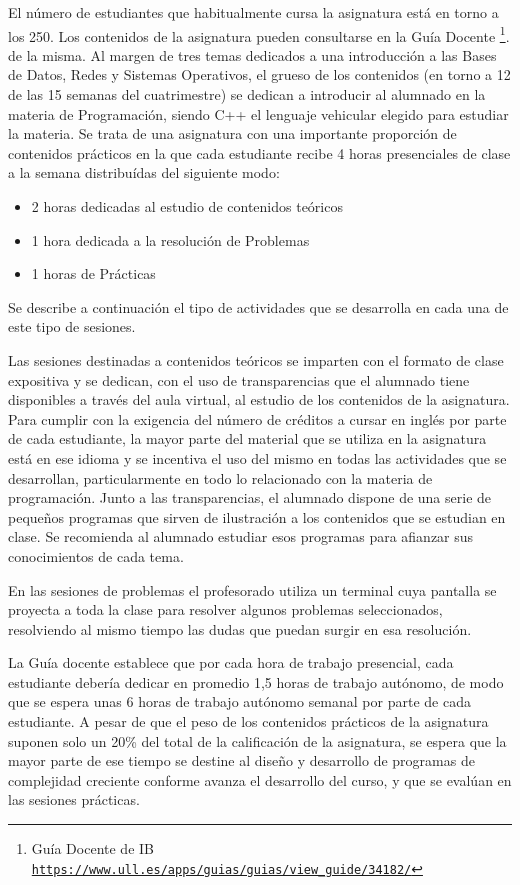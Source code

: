 \documentclass[twocolumn,twoside,a4paper, 10pt]{article}
\begin{document}
El número de estudiantes que habitualmente cursa la asignatura está en torno a los 250. 
Los contenidos de la asignatura pueden consultarse en la Guía Docente
\footnote{Guía Docente de IB\\ \href{https://www.ull.es/apps/guias/guias/view_guide/34182/}{\scriptsize{\texttt{https://www.ull.es/apps/guias/guias/view\_guide/34182/}}}}.
de la misma.
Al margen de tres temas dedicados a una introducción a las Bases de Datos, Redes y Sistemas Operativos,
el grueso de los contenidos (en torno a 12 de las 15 semanas del cuatrimestre) se dedican a introducir al
alumnado en la materia de Programación, siendo C++ el lenguaje vehicular elegido para estudiar la materia.
Se trata de una asignatura con una importante proporción de contenidos prácticos en la que cada estudiante
recibe 4 horas presenciales de clase a la semana distribuídas del siguiente modo:
\begin{itemize}
  \item 2 horas dedicadas al estudio de contenidos teóricos
  \item 1 hora dedicada a la resolución de Problemas
  \item 1 horas de Prácticas
\end{itemize}
Se describe a continuación el tipo de actividades que se desarrolla en cada una de este tipo de sesiones.

Las sesiones destinadas a contenidos teóricos se imparten con el formato de clase expositiva y se dedican, 
con el uso de transparencias que el alumnado tiene disponibles a través del aula virtual, al estudio de los 
contenidos de la asignatura. 
Para cumplir con la exigencia del número de créditos a cursar en inglés por parte de cada estudiante, la mayor parte del material
que se utiliza en la asignatura está en ese idioma y se incentiva el uso del mismo en todas las actividades que se desarrollan,
particularmente en todo lo relacionado con la materia de programación.
Junto a las transparencias, el alumnado dispone de una serie de pequeños programas que sirven de ilustración a
los contenidos que se estudian en clase. 
Se recomienda al alumnado estudiar esos programas para afianzar sus conocimientos de cada tema.

En las sesiones de problemas el profesorado utiliza un terminal cuya pantalla se proyecta a toda la clase para
resolver algunos problemas seleccionados, resolviendo al mismo tiempo las dudas que puedan surgir en esa
resolución. 

La Guía docente establece que por cada hora de trabajo presencial, cada estudiante debería dedicar en 
promedio 1,5 horas de trabajo autónomo, de modo que se espera unas 6 horas de trabajo autónomo semanal por 
parte de cada estudiante. 
A pesar de que el peso de los contenidos prácticos de la asignatura suponen solo un 20\% del total de la
calificación de la asignatura, se espera que la mayor parte de ese tiempo se destine al diseño y desarrollo 
de programas de complejidad creciente conforme avanza el desarrollo del curso, y que se evalúan en las
sesiones prácticas.
\end{document}
